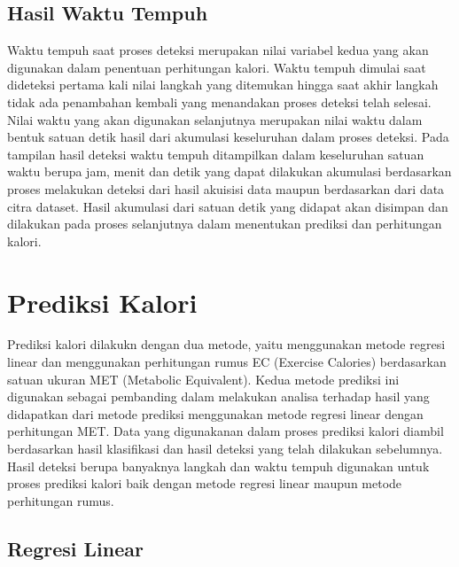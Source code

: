 \subsection{Hasil Waktu Tempuh}
\label{subsec:HasilWaktu}

Waktu tempuh saat proses deteksi merupakan nilai variabel kedua yang akan digunakan dalam penentuan perhitungan kalori. Waktu tempuh dimulai saat dideteksi pertama kali nilai langkah yang ditemukan hingga saat akhir langkah tidak ada penambahan kembali yang menandakan proses deteksi telah selesai. Nilai waktu yang akan digunakan selanjutnya merupakan nilai waktu dalam bentuk satuan detik hasil dari akumulasi keseluruhan dalam proses deteksi. Pada tampilan hasil deteksi waktu tempuh ditampilkan dalam keseluruhan satuan waktu berupa jam, menit dan detik yang dapat dilakukan akumulasi berdasarkan proses melakukan deteksi dari hasil akuisisi data maupun berdasarkan dari data citra dataset. Hasil akumulasi dari satuan detik yang didapat akan disimpan dan dilakukan pada proses selanjutnya dalam menentukan prediksi dan perhitungan kalori.

\section{Prediksi Kalori}
\label{sec:PrediksiKalori}

Prediksi kalori dilakukn dengan dua metode, yaitu menggunakan metode regresi linear dan menggunakan perhitungan rumus EC (Exercise Calories) berdasarkan satuan ukuran MET (Metabolic Equivalent). Kedua metode prediksi ini digunakan sebagai pembanding dalam melakukan analisa terhadap hasil yang didapatkan dari metode prediksi menggunakan metode regresi linear dengan perhitungan MET. Data yang digunakanan dalam proses prediksi kalori diambil berdasarkan hasil klasifikasi dan hasil deteksi yang telah dilakukan sebelumnya. Hasil deteksi berupa banyaknya langkah dan waktu tempuh digunakan untuk proses prediksi kalori baik dengan metode regresi linear maupun metode perhitungan rumus.

\subsection{Regresi Linear}
\label{subsec:PrediksiRegresi}

